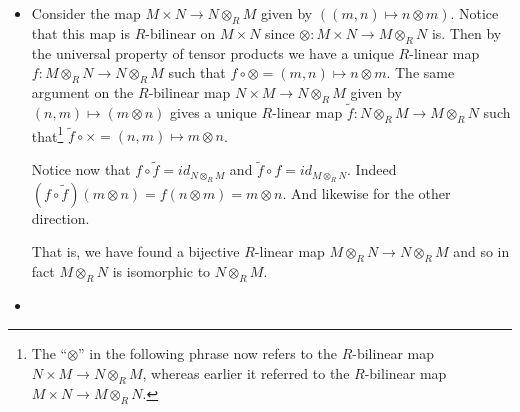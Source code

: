 \documentclass[12pt,letterpaper,boxed]{hmcpset}
\begin{document}


\begin{problem}[1]
	\hfill
\end{problem}

\begin{solution}
\end{solution}

\newpage


\begin{problem}[2]
	\hfill
\end{problem}

\begin{solution}
\end{solution}

\newpage


\begin{problem}[3]
	\hfill
\end{problem}
\begin{solution}
\end{solution}

\newpage


\begin{problem}
	\hfill
\end{problem}

\begin{solution}
\begin{itemize}
\item Consider the map $M \times N \to N \otimes_R M$ given by $((m,n)
\mapsto n \otimes m)$. Notice that this map is $R$-bilinear on $M \times
N$ since $\otimes: M \times N \to M \otimes_R N$ is.
Then by the universal property of tensor products we have a unique
$R$-linear map $f: M \otimes_R N \to N \otimes_R M$ such that $f \circ
\otimes = (m,n) \mapsto n \otimes m$. 
The same argument on the $R$-bilinear map $N \times M \to N \otimes_R
M$ given by $(n,m) \mapsto (m \otimes n)$ gives a unique $R$-linear
map $\tilde f: N \otimes_R M \to M \otimes_R N$ such that\footnote{
The ``$\otimes$'' in the following phrase now refers to the
$R$-bilinear map $N \times M \to N \otimes_R M$, whereas earlier it
referred to the $R$-bilinear map $M \times N \to M \otimes_R N$.
} $\tilde f
\circ \times = (n,m) \mapsto m \otimes n$. 

Notice now that $f \circ \tilde f = id_{N \otimes_R M}$ and $\tilde f
\circ f = id_{M \otimes_R N}$. Indeed $(f \circ \tilde f)(m \otimes n)
= f(n \otimes m) = m \otimes n$. And likewise for the other direction.

That is, we have found a bijective $R$-linear map $M \otimes_R N \to N
\otimes_R M$ and so in fact $M \otimes_R N$ is isomorphic to $N
\otimes_R M$.

\item
\end{itemize}
\end{solution}
\end{document}
